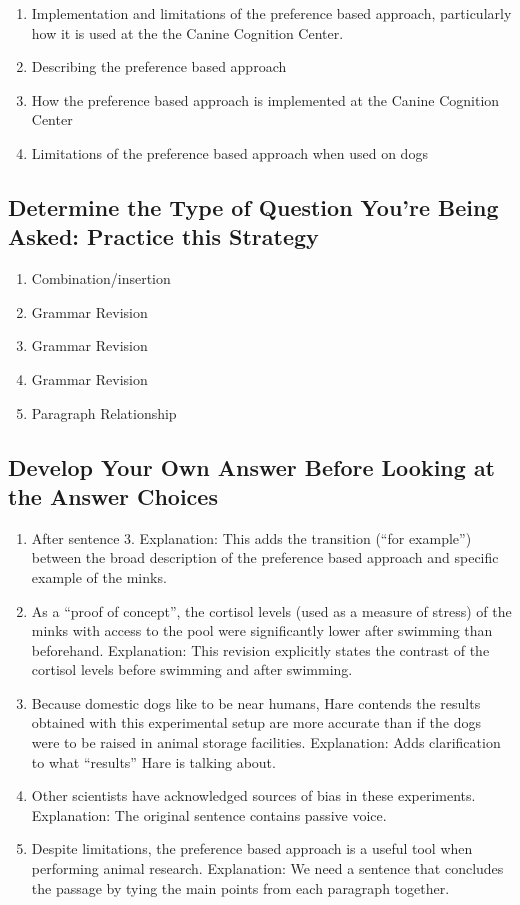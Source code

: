 \begin{enumerate}
\item Implementation and limitations of the preference based approach, particularly how it is used at the the Canine Cognition Center.
\item Describing the preference based approach 
\item How the preference based approach is implemented at the Canine Cognition Center
\item Limitations of the preference based approach when used on dogs
\end{enumerate}

\subsection{Determine the Type of Question You're Being Asked: Practice this Strategy}

\begin{enumerate}
\item Combination/insertion
\item Grammar Revision
\item Grammar Revision
\item Grammar Revision
\item Paragraph Relationship
\end{enumerate}

\subsection{}

\subsection{Develop Your Own Answer Before Looking at the Answer Choices}

\begin{enumerate}
\item After sentence 3. Explanation: This adds the transition (``for example'') between the broad description of the preference based approach and specific example of the minks.
\item As a ``proof of concept'', the cortisol levels (used as a measure of stress) of the minks with access to the pool were significantly lower after swimming than beforehand. Explanation: This revision explicitly states the contrast of the cortisol levels before swimming and after swimming. 
\item Because domestic dogs like to be near humans, Hare contends the results obtained with this experimental setup are more accurate than if the dogs were to be raised in animal storage facilities. Explanation: Adds clarification to what ``results'' Hare is talking about. 
\item Other scientists have acknowledged sources of bias in these experiments. Explanation: The original sentence contains passive voice.
\item Despite limitations, the preference based approach is a useful tool when performing animal research. Explanation: We need a sentence that concludes the passage by tying the main points from each paragraph together. 
\end{enumerate}


